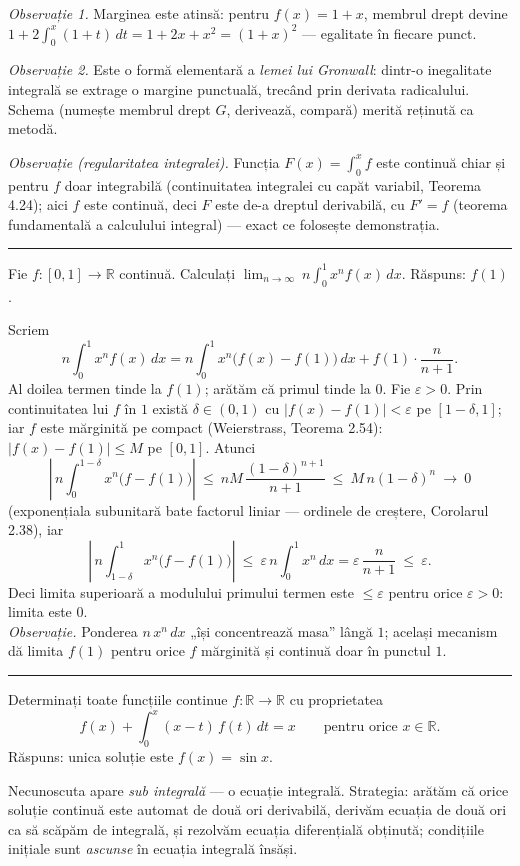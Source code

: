\emph{Observație 1.} Marginea este atinsă: pentru $f(x)=1+x$, membrul drept devine $1+2\int_0^x(1+t)\,dt=1+2x+x^2=(1+x)^2$ --- egalitate în fiecare punct.

\emph{Observație 2.} Este o formă elementară a \emph{lemei lui Gronwall}: dintr-o inegalitate integrală se extrage o margine punctuală, trecând prin derivata radicalului. Schema (numește membrul drept $G$, derivează, compară) merită reținută ca metodă.

\emph{Observație (regularitatea integralei).} Funcția $F(x)=\int_{0}^{x}f$ este continuă chiar și pentru $f$ doar integrabilă (continuitatea integralei cu capăt variabil, Teorema 4.24); aici $f$ este continuă, deci $F$ este de-a dreptul derivabilă, cu $F'=f$ (teorema fundamentală a calculului integral) --- exact ce folosește demonstrația.
\vspace{1mm}\hrule

Fie $f:[0,1]\to\mathbb{R}$ continuă. Calculați $\displaystyle\lim_{n\to\infty}\ n\int_0^1x^nf(x)\,dx$.
\sol Răspuns: $f(1)$.

Scriem
\[ n\int_0^1x^nf(x)\,dx=n\int_0^1x^n\bigl(f(x)-f(1)\bigr)\,dx+f(1)\cdot\frac{n}{n+1} . \]
Al doilea termen tinde la $f(1)$; arătăm că primul tinde la $0$. Fie $\varepsilon>0$. Prin continuitatea lui $f$ în $1$ există $\delta\in(0,1)$ cu $|f(x)-f(1)|<\varepsilon$ pe $[1-\delta,1]$; iar $f$ este mărginită pe compact (Weierstrass, Teorema 2.54): $|f(x)-f(1)|\le M$ pe $[0,1]$. Atunci
\[ \left|\,n\int_0^{1-\delta}x^n\bigl(f-f(1)\bigr)\right|\ \le\ nM\,\frac{(1-\delta)^{n+1}}{n+1}\ \le\ M\,n(1-\delta)^n\ \to\ 0 \]
(exponențiala subunitară bate factorul liniar --- ordinele de creștere, Corolarul 2.38), iar
\[ \left|\,n\int_{1-\delta}^1x^n\bigl(f-f(1)\bigr)\right|\ \le\ \varepsilon\,n\int_0^1x^n\,dx=\varepsilon\,\frac{n}{n+1}\ \le\ \varepsilon . \]
Deci limita superioară a modulului primului termen este $\le\varepsilon$ pentru orice $\varepsilon>0$: limita este $0$.\\[2pt]
\emph{Observație.} Ponderea $n\,x^n\,dx$ „își concentrează masa'' lângă $1$; același mecanism dă limita $f(1)$ pentru orice $f$ mărginită și continuă doar în punctul $1$.
\vspace{1mm}\hrule

Determinați toate funcțiile continue $f:\mathbb{R}\to\mathbb{R}$ cu proprietatea
\[ f(x)+\int_{0}^{x}(x-t)\,f(t)\,dt=x\qquad\text{pentru orice }x\in\mathbb{R} . \]
\sol Răspuns: unica soluție este $f(x)=\sin x$.

Necunoscuta apare \emph{sub integrală} --- o ecuație integrală. Strategia: arătăm că orice soluție continuă este automat de două ori derivabilă, derivăm ecuația de două ori ca să scăpăm de integrală, și rezolvăm ecuația diferențială obținută; condițiile inițiale sunt \emph{ascunse} în ecuația integrală însăși.

